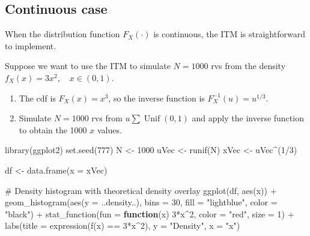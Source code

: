 \documentclass[
  letterpaper,
  DIV=11,
  numbers=noendperiod]{scrreprt}
\newenvironment{Shaded}{\begin{snugshade}}{\end{snugshade}}
\newcommand{\AttributeTok}[1]{\textcolor[rgb]{0.40,0.45,0.13}{#1}}
\newcommand{\CommentTok}[1]{\textcolor[rgb]{0.37,0.37,0.37}{#1}}
\newcommand{\ControlFlowTok}[1]{\textcolor[rgb]{0.00,0.23,0.31}{\textbf{#1}}}
\newcommand{\DecValTok}[1]{\textcolor[rgb]{0.68,0.00,0.00}{#1}}
\newcommand{\FunctionTok}[1]{\textcolor[rgb]{0.28,0.35,0.67}{#1}}
\newcommand{\NormalTok}[1]{\textcolor[rgb]{0.00,0.23,0.31}{#1}}
\newcommand{\OtherTok}[1]{\textcolor[rgb]{0.00,0.23,0.31}{#1}}
\newcommand{\SpecialCharTok}[1]{\textcolor[rgb]{0.37,0.37,0.37}{#1}}
\newcommand{\StringTok}[1]{\textcolor[rgb]{0.13,0.47,0.30}{#1}}
\begin{document}
\subsection{Continuous case}\label{continuous-case}

When the distribution function \(F_X(\cdot)\) is continuous, the ITM is
straightforward to implement.

Suppose we want to use the ITM to simulate \(N=1000\) rvs from the
density \(f_X(x)=3x^2,\quad x\in(0,1)\).

\begin{enumerate}
\def\labelenumi{\arabic{enumi}.}
\item
  The cdf is \(F_X(x)=x^3\), so the inverse function is
  \(F_X^{-1}(u)=u^{1/3}\).
\item
  Simulate \(N=1000\) rvs from \(u\sum \operatorname{Unif}(0,1)\) and
  apply the inverse function to obtain the 1000 \(x\) values.
\end{enumerate}

\begin{Shaded}
\begin{Highlighting}[]
\FunctionTok{library}\NormalTok{(ggplot2)}
\FunctionTok{set.seed}\NormalTok{(}\DecValTok{777}\NormalTok{)}
\NormalTok{N }\OtherTok{\textless{}{-}} \DecValTok{1000}
\NormalTok{uVec }\OtherTok{\textless{}{-}} \FunctionTok{runif}\NormalTok{(N)}
\NormalTok{xVec }\OtherTok{\textless{}{-}}\NormalTok{ uVec}\SpecialCharTok{\^{}}\NormalTok{(}\DecValTok{1}\SpecialCharTok{/}\DecValTok{3}\NormalTok{)}

\NormalTok{df }\OtherTok{\textless{}{-}} \FunctionTok{data.frame}\NormalTok{(}\AttributeTok{x =}\NormalTok{ xVec)}

\CommentTok{\# Density histogram with theoretical density overlay}
\FunctionTok{ggplot}\NormalTok{(df, }\FunctionTok{aes}\NormalTok{(x)) }\SpecialCharTok{+}
  \FunctionTok{geom\_histogram}\NormalTok{(}\FunctionTok{aes}\NormalTok{(}\AttributeTok{y =}\NormalTok{ ..density..), }\AttributeTok{bins =} \DecValTok{30}\NormalTok{,}
                 \AttributeTok{fill =} \StringTok{"lightblue"}\NormalTok{, }\AttributeTok{color =} \StringTok{"black"}\NormalTok{) }\SpecialCharTok{+}
  \FunctionTok{stat\_function}\NormalTok{(}\AttributeTok{fun =} \ControlFlowTok{function}\NormalTok{(x) }\DecValTok{3}\SpecialCharTok{*}\NormalTok{x}\SpecialCharTok{\^{}}\DecValTok{2}\NormalTok{,}
                \AttributeTok{color =} \StringTok{"red"}\NormalTok{, }\AttributeTok{size =} \DecValTok{1}\NormalTok{) }\SpecialCharTok{+}
  \FunctionTok{labs}\NormalTok{(}\AttributeTok{title =} \FunctionTok{expression}\NormalTok{(}\FunctionTok{f}\NormalTok{(x) }\SpecialCharTok{==} \DecValTok{3}\SpecialCharTok{*}\NormalTok{x}\SpecialCharTok{\^{}}\DecValTok{2}\NormalTok{),}
       \AttributeTok{y =} \StringTok{"Density"}\NormalTok{, }\AttributeTok{x =} \StringTok{"x"}\NormalTok{)}
\end{Highlighting}
\end{Shaded}
\end{document}
